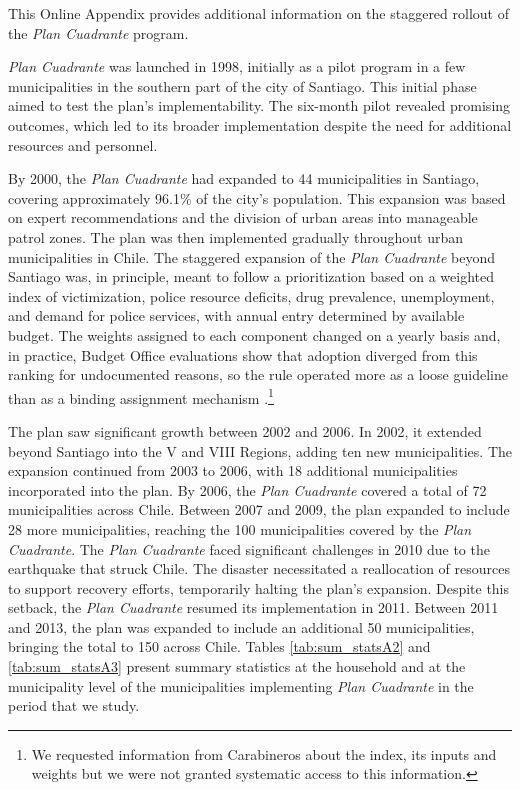 This Online Appendix provides additional information on the staggered rollout of the \emph{Plan Cuadrante} program.


\emph{Plan Cuadrante} was launched in 1998, initially as a pilot program in a few municipalities in the southern part of the city of Santiago. This initial phase aimed to test the plan's implementability. The six-month pilot revealed promising outcomes, which led to its broader implementation despite the need for additional resources and personnel.

By 2000, the \emph{Plan Cuadrante} had expanded to 44 municipalities in Santiago, covering approximately 96.1\% of the city’s population. This expansion was based on expert recommendations and the division of urban areas into manageable patrol zones. The plan was then implemented gradually throughout urban municipalities in Chile. The staggered expansion of the \emph{Plan Cuadrante} beyond Santiago was, in principle, meant to follow a prioritization based on a weighted index of victimization, police resource deficits, drug prevalence, unemployment, and demand for police services, with annual entry determined by available budget. The weights assigned to each component changed on a yearly basis and, in practice, Budget Office evaluations show that adoption diverged from this ranking for undocumented reasons, so the rule operated more as a loose guideline than as a binding assignment mechanism \citep{DIPRES2014}.\footnote{We requested information from Carabineros about the index, its inputs and weights but we were not granted systematic access to this information.}


The plan saw significant growth between 2002 and 2006. In 2002, it extended beyond Santiago into the V and VIII Regions, adding ten new municipalities. The expansion continued from 2003 to 2006, with 18 additional municipalities incorporated into the plan. By 2006, the \emph{Plan Cuadrante} covered a total of 72 municipalities across Chile. Between 2007 and 2009, the plan expanded to include 28 more municipalities, reaching the 100 municipalities covered by the \emph{Plan Cuadrante}. The \emph{Plan Cuadrante} faced significant challenges in 2010 due to the earthquake that struck Chile. The disaster necessitated a reallocation of resources to support recovery efforts, temporarily halting the plan’s expansion. Despite this setback, the \emph{Plan Cuadrante} resumed its implementation in 2011. Between 2011 and 2013, the plan was expanded to include an additional 50 municipalities, bringing the total to 150 across Chile. Tables \ref{tab:sum_statsA2} and \ref{tab:sum_statsA3} present summary statistics at the household and at the municipality level of the municipalities implementing \emph{Plan Cuadrante} in the period that we study. 

\vspace{5mm}




\clearpage
